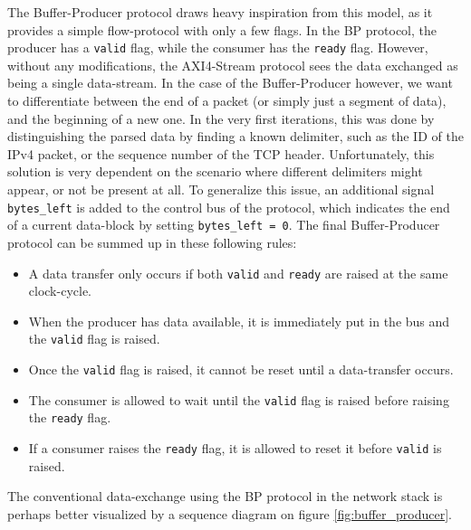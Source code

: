The Buffer-Producer protocol draws heavy inspiration from this model, as it
provides a simple flow-protocol with only a few flags. In the BP protocol,
the producer has a \texttt{valid} flag, while the consumer has the
\texttt{ready} flag. However, without any modifications, the AXI4-Stream protocol sees
the data exchanged as being a single data-stream.
In the case of the Buffer-Producer however, we want to differentiate between the
end of a packet (or simply just a segment of data), and the beginning of a new
one. In the very first iterations, this was done by distinguishing the parsed
data by finding a known delimiter, such as the ID of the IPv4 packet, or the
sequence number of the TCP header. Unfortunately, this solution is very
dependent on the scenario where different delimiters might appear, or not be
present at all. To generalize this issue, an additional signal
\texttt{bytes\_left}
is added to the control bus of the protocol, which
indicates the end of a current data-block by setting \texttt{bytes\_left = 0}.
The final Buffer-Producer protocol can be summed up in these following
rules:
\begin{itemize}
	\item A data transfer only occurs if both \texttt{valid} and \texttt{ready}
		are raised at the same clock-cycle.
	\item When the producer has data available, it is immediately put in
		the bus and the \texttt{valid} flag is raised.
	\item Once the \texttt{valid} flag is raised, it cannot be reset until
		a data-transfer occurs.
	\item The consumer is allowed to wait until the \texttt{valid} flag is
		raised before raising the \texttt{ready} flag.
	\item If a consumer raises the \texttt{ready} flag, it is allowed to
		reset it before \texttt{valid} is raised.
\end{itemize}

The conventional data-exchange using the BP protocol in the network
stack is perhaps better visualized by a sequence diagram on figure
\ref{fig:buffer_producer}.


